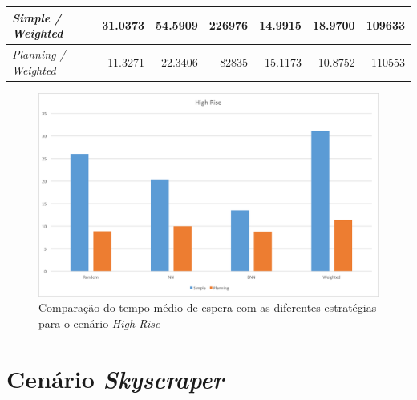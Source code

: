 \begin{table}[htb!]
\begin{tabular}{|l|r|r|r|r|r|r|}
\textit{Simple / Weighted}        & \cellcolor[HTML]{FD6864}31.0373 & \cellcolor[HTML]{FD6864}54.5909 & \cellcolor[HTML]{FD6864}226976  & \cellcolor[HTML]{67FD9A}14.9915 & \cellcolor[HTML]{FD6864}18.9700 & \cellcolor[HTML]{67FD9A}109633  \\ \hline
\textit{Planning / Weighted}      & 11.3271                         & 22.3406                         &  82835                          & 15.1173                         & 10.8752                         & 110553                          \\ \hline
\end{tabular}
\end{table}

\begin{figure}[htb]
  \centering
  \includegraphics[scale=0.5]{img/chart-averages-high-rise}
  \caption{Comparação do tempo médio de espera com as diferentes estratégias
    para o cenário \textit{High Rise}}
  \label{fig:result:average:high-rise}
\end{figure}

\section{Cenário \textit{Skyscraper}}

\lipsum[1]

